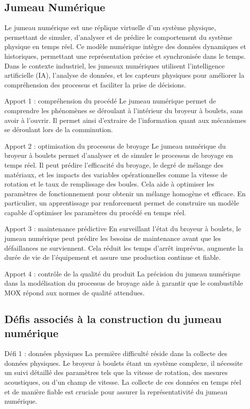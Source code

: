 
\subsection{Jumeau Numérique}


Le jumeau numérique est une réplique virtuelle d'un système physique, permettant de simuler, d'analyser et de prédire le comportement du système physique en temps réel. Ce modèle numérique intègre des données dynamiques et historiques, permettant une représentation précise et synchronisée dans le temps. Dans le contexte industriel, les jumeaux numériques utilisent l'intelligence artificielle (IA), l'analyse de données, et les capteurs physiques pour améliorer la compréhension des processus et faciliter la prise de décisions.


Apport 1 : compréhension du procédé
Le jumeau numérique permet de comprendre les phénomènes se déroulant à l'intérieur du broyeur à boulets, sans avoir à l'ouvrir. Il permet ainsi d'extraire de l'information quant aux mécanismes se déroulant lors de la comminution.

Apport 2 : optimisation du processus de broyage
Le jumeau numérique du broyeur à boulets permet d'analyser et de simuler le processus de broyage en temps réel. Il peut prédire l'efficacité du broyage, le degré de mélange des matériaux, et les impacts des variables opérationnelles comme la vitesse de rotation et le taux de remplissage des boules. Cela aide à optimiser les paramètres de fonctionnement pour obtenir un mélange homogène et efficace. En particulier, un apprentissage par renforcement permet de construire un modèle capable d'optimiser les paramètres du procédé en temps réel.

Apport 3 : maintenance prédictive
En surveillant l'état du broyeur à boulets, le jumeau numérique peut prédire les besoins de maintenance avant que les défaillances ne surviennent. Cela réduit les temps d'arrêt imprévus, augmente la durée de vie de l'équipement et assure une production continue et fiable.

Apport 4 : contrôle de la qualité du produit
La précision du jumeau numérique dans la modélisation du processus de broyage aide à garantir que le combustible MOX répond aux normes de qualité attendues.

\subsection{Défis associés à la construction du jumeau numérique}
Défi 1 : données physiques
La première difficulté réside dans la collecte des données physiques. Le broyeur à boulets étant un système complexe, il nécessite un suivi détaillé des paramètres tels que la vitesse de rotation, des mesures acoustiques, ou d'un champ de vitesse. La collecte de ces données en temps réel et de manière fiable est cruciale pour assurer la représentativité du jumeau numérique.

